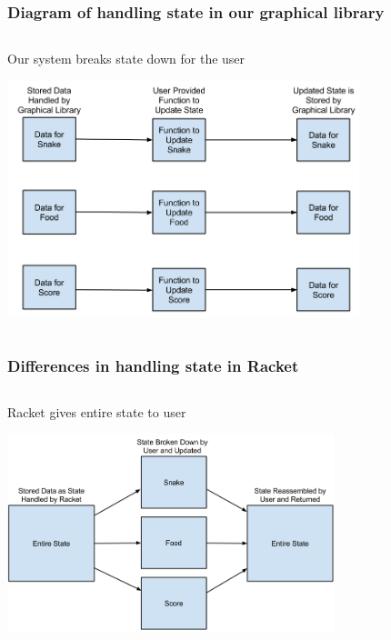 \documentclass{beamer}
\begin{document}
\begin{frame}
\frametitle{Diagram of handling state in our graphical library}
\begin{columns}[T]
\begin{column}{.95\textwidth}
\begin{block}{Our system breaks state down for the user}
\begin{center}
\includegraphics[width=290pt]{Handling_State_in_Graphical_Library}
\end{center}
\end{block}
\end{column}
\end{columns}
\end{frame}

\begin{frame}
\frametitle{Differences in handling state in Racket}
\begin{columns}[T]
\begin{column}{.95\textwidth}
\begin{block}{Racket gives entire state to user}
\begin{center}
\includegraphics[width=270pt]{Rackets_State_Diagram}
\end{center}
\end{block}
\end{column}
\end{columns}
\end{frame}
\end{document}

